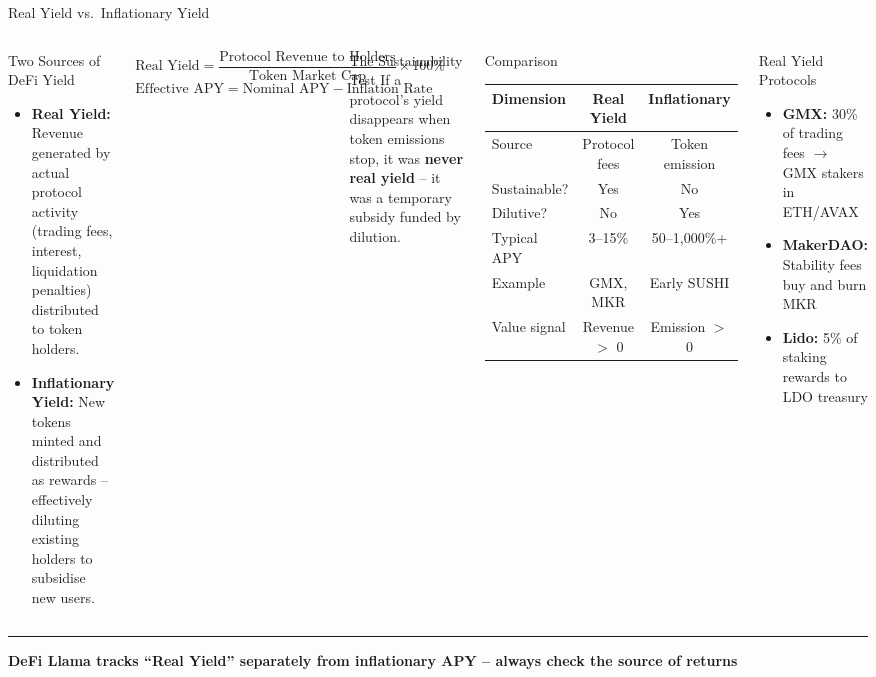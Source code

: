 \documentclass[8pt,aspectratio=169]{beamer}
\newcommand{\bottomnote}[1]{\vfill\vspace{-2mm}\textcolor{mllavender2}{\rule{\textwidth}{0.4pt}}\vspace{1mm}\footnotesize\textbf{#1}}
\begin{document}
\begin{frame}{Real Yield vs.\ Inflationary Yield}
\begin{columns}[T]
\begin{block}{Two Sources of DeFi Yield}
\footnotesize
\begin{itemize}
  \item \textbf{Real Yield:} Revenue generated by actual protocol activity (trading fees, interest, liquidation penalties) distributed to token holders.
  \item \textbf{Inflationary Yield:} New tokens minted and distributed as rewards -- effectively diluting existing holders to subsidise new users.
\end{itemize}
\end{block}
\vspace{1mm}
\footnotesize
\[
\text{Real Yield} = \frac{\text{Protocol Revenue to Holders}}{\text{Token Market Cap}} \times 100\%
\]
\[
\text{Effective APY} = \text{Nominal APY} - \text{Inflation Rate}
\]
\vspace{1mm}
\begin{alertblock}{\footnotesize The Sustainability Test}
\footnotesize
If a protocol's yield disappears when token emissions stop, it was \textbf{never real yield} -- it was a temporary subsidy funded by dilution.
\end{alertblock}

\begin{block}{Comparison}
\footnotesize
\renewcommand{\arraystretch}{1.1}
\begin{tabular}{lcc}
\toprule
\textbf{Dimension} & \textbf{Real Yield} & \textbf{Inflationary} \\
\midrule
Source & Protocol fees & Token emission \\
Sustainable? & Yes & No \\
Dilutive? & No & Yes \\
Typical APY & 3--15\% & 50--1,000\%+ \\
Example & GMX, MKR & Early SUSHI \\
Value signal & Revenue $>$ 0 & Emission $>$ 0 \\
\bottomrule
\end{tabular}
\end{block}
\vspace{2mm}
\begin{exampleblock}{\footnotesize Real Yield Protocols}
\footnotesize
\begin{itemize}
  \item \textbf{GMX:} 30\% of trading fees $\rightarrow$ GMX stakers in ETH/AVAX
  \item \textbf{MakerDAO:} Stability fees buy and burn MKR
  \item \textbf{Lido:} 5\% of staking rewards to LDO treasury
\end{itemize}
\end{exampleblock}
\end{columns}
\bottomnote{DeFi Llama tracks ``Real Yield'' separately from inflationary APY -- always check the source of returns}
\end{frame}
\end{document}
